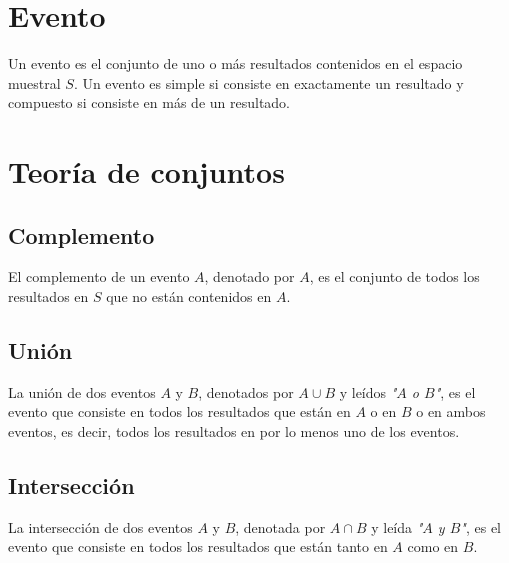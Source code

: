 \documentclass{report}
\begin{document}
    \section*{Evento}
    Un evento es el conjunto de uno o más resultados contenidos en el espacio 
    muestral $S$. Un evento es simple si consiste en exactamente un resultado y 
    compuesto si consiste en más de un resultado.

    \section*{Teoría de conjuntos}

      \subsection*{Complemento}
      El complemento de un evento $A$, denotado por $A$, es el conjunto de todos los 
      resultados en $S$ que no están contenidos en $A$. 

      \subsection*{Unión}
      La unión de dos eventos $A$ y $B$, denotados por $A\cup B$ y leídos \textit{"$A$ o $B$"}, 
      es el evento que consiste en todos los resultados que están en $A$ o en $B$ 
      o en ambos eventos, es decir, todos  los resultados en por lo menos uno de 
      los eventos.

      \subsection*{Intersección}
      La intersección de dos eventos $A$ y $B$, denotada por $A\cap B$ y leída 
      \textit{"$A$ y $B$"}, es el evento que consiste en todos los resultados 
      que están tanto en $A$ como en $B$.
\end{document}
